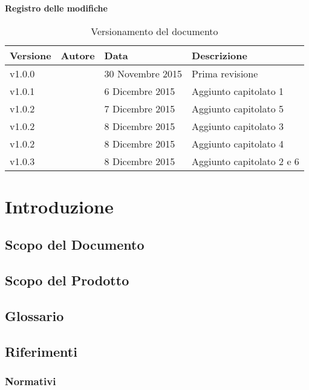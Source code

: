 \documentclass[12pt,a4paper]{article}
\begin{document}
\Large{\textbf{Registro delle modifiche}}\\
\normalsize

\begin{table}[h]
\begin{center}

\begin{tabular}{p{} p{} p{} p{}}
\toprule
\textbf{Versione}	&	\textbf{Autore}	&	\textbf{Data}	&	\textbf{Descrizione}\\
\midrule
\midrule
v1.0.0	&	\NDC	&	30 Novembre 2015 	&	Prima revisione\\
\midrule
v1.0.1	&	\TP	&	6 Dicembre 2015	&	Aggiunto capitolato 1\\
\midrule
v1.0.2	&	\TP	&	7 Dicembre 2015	&	Aggiunto capitolato 5\\
v1.0.2	&	\IB	&	8 Dicembre 2015	&	Aggiunto capitolato 3\\
\midrule
v1.0.2	&	\IB	&	8 Dicembre 2015	&	Aggiunto capitolato 4\\
\midrule
v1.0.3	&	\AVE	&	8 Dicembre 2015	&	Aggiunto capitolato 2 e 6\\
\bottomrule
\end{tabular}
\caption{Versionamento del documento}
\label{tabVers1}
\end{center}
\end{table}
\newpage

\tableofcontents
\newpage

\section{Introduzione}
\subsection{Scopo del Documento}
\subsection{Scopo del Prodotto}
\subsection{Glossario}
\subsection{Riferimenti}
\subsubsection{Normativi}
\end{document}
